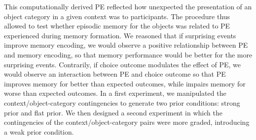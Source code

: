 \documentclass[a4paper,12pt]{article} 			%
\begin{document}
\par
This computationally derived PE reflected how unexpected the presentation of an object category in a given context was to participants. The procedure thus allowed to test whether episodic memory for the objects was related to PE experienced during memory formation. We reasoned that if surprising events improve memory encoding, we would observe a positive relationship between PE and memory encoding, so that memory performance would be better for the more surprising  events. Contrarily, if choice outcome modulates the effect of PE, we would observe an interaction between PE and choice outcome so that PE improves memory for better than expected outcomes, while impairs memory for worse than expected outcomes. In a first experiment, we manipulated the context/object-category contingencies to generate two prior conditions: strong prior and flat prior. We then designed a second experiment in which the contingencies of the context/object-category pairs were more graded, introducing a weak prior condition.


\end{document}
